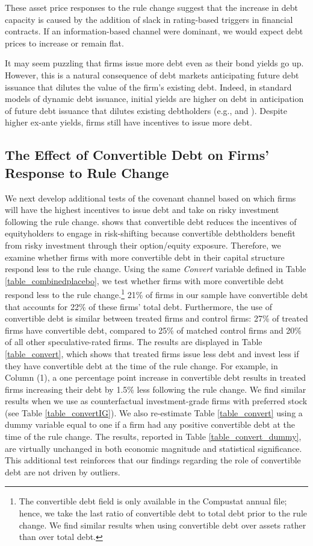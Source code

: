 \documentclass[a4paper, 12pt]{article}
\begin{document}
These asset price responses to the rule change suggest that the increase in debt capacity is caused by the addition of slack in rating-based triggers in financial contracts. If an information-based channel were dominant, we would expect debt prices to increase or remain flat.

It may seem puzzling that firms issue more debt even as their bond yields go up. However, this is a natural consequence of debt markets anticipating future debt issuance that dilutes the value of the firm's existing debt. Indeed, in standard models of dynamic debt issuance, initial yields are higher on debt in anticipation of future debt issuance that dilutes existing debtholders (e.g., \citealp{bizer1992sequential} and \citealp{admati2018leverage}). Despite higher ex-ante yields, firms still have incentives to issue more debt.

\subsection{The Effect of Convertible Debt on Firms' Response to Rule Change}

We next develop additional tests of the covenant channel based on which firms will have the highest incentives to issue debt and take on risky investment following the rule change. \cite{green1984investment} shows that convertible debt reduces the incentives of equityholders to engage in risk-shifting because convertible debtholders benefit from risky investment through their option/equity exposure. Therefore, we examine whether firms with more convertible debt in their capital structure respond less to the rule change. Using the same \textit{Convert} variable defined in Table \ref{table_combinedplacebo}, we test whether firms with more convertible debt respond less to the rule change.\footnote{The convertible debt field is only available in the Compustat annual file; hence, we take the last ratio of convertible debt to total debt prior to the rule change. We find similar results when using convertible debt over assets rather than over total debt.} 21\% of firms in our sample have convertible debt that accounts for 22\% of these firms' total debt. Furthermore, the use of convertible debt is similar between treated firms and control firms: 27\% of treated firms have convertible debt, compared to 25\% of matched control firms and 20\% of all other speculative-rated firms. The results are displayed in Table \ref{table_convert}, which shows that treated firms issue less debt and invest less if they have convertible debt at the time of the rule change. For example, in Column (1), a one percentage point increase in convertible debt results in treated firms increasing their debt by 1.5\% less following the rule change. We find similar results when we use as counterfactual investment-grade firms with preferred stock (see Table \ref{table_convertIG}). We also re-estimate Table \ref{table_convert} using a dummy variable equal to one if a firm had any positive convertible debt at the time of the rule change. The results, reported in Table \ref{table_convert_dummy}, are virtually unchanged in both economic magnitude and statistical significance. This additional test reinforces that our findings regarding the role of convertible debt are not driven by outliers.
\end{document}
